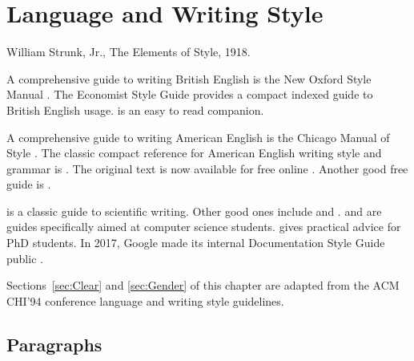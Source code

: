 %
%
% 
% 
% 


\chapter{Language and Writing Style}
\label{chap:Style}


{
William Strunk, Jr., The Elements of Style, 1918.
}


A comprehensive guide to writing British English is the New Oxford
Style Manual \parencite{NewOxfordStyleManual-3Ed}. The Economist Style
Guide \parencite{EconomistStyleGuide-12Ed} provides a compact indexed guide
to British English usage. \textcite{Zinsser-OnWritingWell-7Ed} is an
easy to read companion.

A comprehensive guide to writing American English is the Chicago
Manual of Style \parencite{ChicagoManualStyle-17Ed}.  The classic
compact reference for American English writing style and grammar is
\textcite{StrunkWhite-4Ed}. The original text is now available for
free online \parencite{Strunk-1Ed}. Another good free guide is
\textcite{NASAGuide}.

\textcite{Alley-CraftScientificWriting-4Ed} is a classic guide to
scientific writing. Other good ones include
\textcite{Booth-CraftResearch-4Ed} and
\textcite{Booth-CommunicatingScience-2Ed}.
%
\textcite{Zobel-WritingCompSci} and \textcite{BugsInWriting} are guides
specifically aimed at computer science students.
\textcite{Phillips-HowGetPhD} gives practical advice for PhD
students.
%
In 2017, Google made its internal Documentation Style Guide
public \parencite{GoogleStyleGuide}.


Sections~\ref{sec:Clear} and \ref{sec:Gender} of this chapter are
adapted from the ACM CHI'94 conference language and writing style
guidelines.









\section{Paragraphs}


